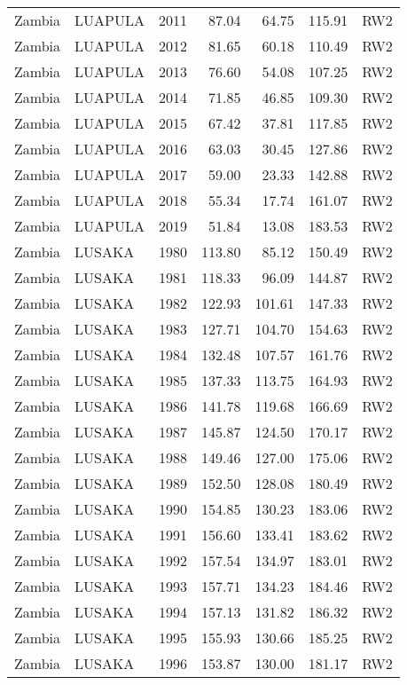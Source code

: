 \begin{longtable}{lllrrrl}
  Zambia & LUAPULA & 2011 & 87.04 & 64.75 & 115.91 & RW2 \\ 
  Zambia & LUAPULA & 2012 & 81.65 & 60.18 & 110.49 & RW2 \\ 
  Zambia & LUAPULA & 2013 & 76.60 & 54.08 & 107.25 & RW2 \\ 
  Zambia & LUAPULA & 2014 & 71.85 & 46.85 & 109.30 & RW2 \\ 
  Zambia & LUAPULA & 2015 & 67.42 & 37.81 & 117.85 & RW2 \\ 
  Zambia & LUAPULA & 2016 & 63.03 & 30.45 & 127.86 & RW2 \\ 
  Zambia & LUAPULA & 2017 & 59.00 & 23.33 & 142.88 & RW2 \\ 
  Zambia & LUAPULA & 2018 & 55.34 & 17.74 & 161.07 & RW2 \\ 
  Zambia & LUAPULA & 2019 & 51.84 & 13.08 & 183.53 & RW2 \\ 
  Zambia & LUSAKA & 1980 & 113.80 & 85.12 & 150.49 & RW2 \\ 
  Zambia & LUSAKA & 1981 & 118.33 & 96.09 & 144.87 & RW2 \\ 
  Zambia & LUSAKA & 1982 & 122.93 & 101.61 & 147.33 & RW2 \\ 
  Zambia & LUSAKA & 1983 & 127.71 & 104.70 & 154.63 & RW2 \\ 
  Zambia & LUSAKA & 1984 & 132.48 & 107.57 & 161.76 & RW2 \\ 
  Zambia & LUSAKA & 1985 & 137.33 & 113.75 & 164.93 & RW2 \\ 
  Zambia & LUSAKA & 1986 & 141.78 & 119.68 & 166.69 & RW2 \\ 
  Zambia & LUSAKA & 1987 & 145.87 & 124.50 & 170.17 & RW2 \\ 
  Zambia & LUSAKA & 1988 & 149.46 & 127.00 & 175.06 & RW2 \\ 
  Zambia & LUSAKA & 1989 & 152.50 & 128.08 & 180.49 & RW2 \\ 
  Zambia & LUSAKA & 1990 & 154.85 & 130.23 & 183.06 & RW2 \\ 
  Zambia & LUSAKA & 1991 & 156.60 & 133.41 & 183.62 & RW2 \\ 
  Zambia & LUSAKA & 1992 & 157.54 & 134.97 & 183.01 & RW2 \\ 
  Zambia & LUSAKA & 1993 & 157.71 & 134.23 & 184.46 & RW2 \\ 
  Zambia & LUSAKA & 1994 & 157.13 & 131.82 & 186.32 & RW2 \\ 
  Zambia & LUSAKA & 1995 & 155.93 & 130.66 & 185.25 & RW2 \\ 
  Zambia & LUSAKA & 1996 & 153.87 & 130.00 & 181.17 & RW2 \\ 

\end{longtable}
